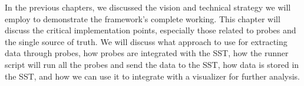 In the previous chapters, we discussed the vision and technical strategy we will employ to demonstrate the framework's complete working. This chapter will discuss the critical implementation points, especially those related to probes and the single source of truth. We will discuss what approach to use for extracting data through probes, how probes are integrated with the SST, how the runner script will run all the probes and send the data to the SST, how data is stored in the SST, and how we can use it to integrate with a visualizer for further analysis.